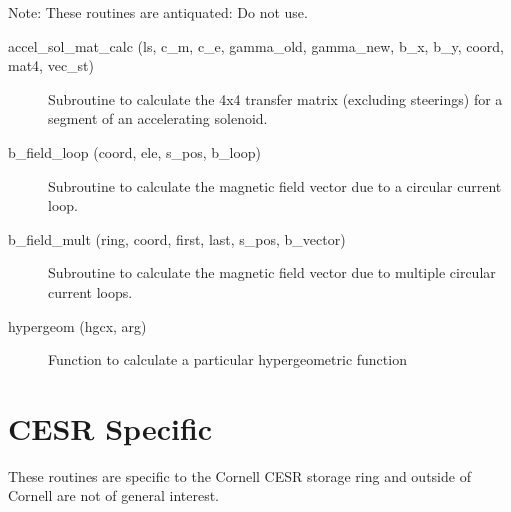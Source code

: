 Note: These routines are antiquated: Do not use.

\begin{description}

\item[accel\_sol\_mat\_calc (ls, c\_m, c\_e, gamma\_old, gamma\_new, 
b\_x, b\_y, coord, mat4, vec\_st)] \Newline
Subroutine to calculate the 4x4 transfer matrix (excluding steerings) for a 
segment of an accelerating solenoid. 

\item[b\_field\_loop (coord, ele, s\_pos, b\_loop)] \Newline
Subroutine to calculate the magnetic field vector due to a 
circular current loop. 

\item[b\_field\_mult (ring, coord, first, last, s\_pos, b\_vector)] \Newline
Subroutine to calculate the magnetic field vector due to multiple 
circular current loops. 

\item[hypergeom (hgcx, arg)] \Newline
Function to calculate a particular hypergeometric function 

\end{description}

\section{CESR Specific}
\label{r:cesr}

These routines are specific to the Cornell CESR storage ring and
outside of Cornell are not of general interest.

